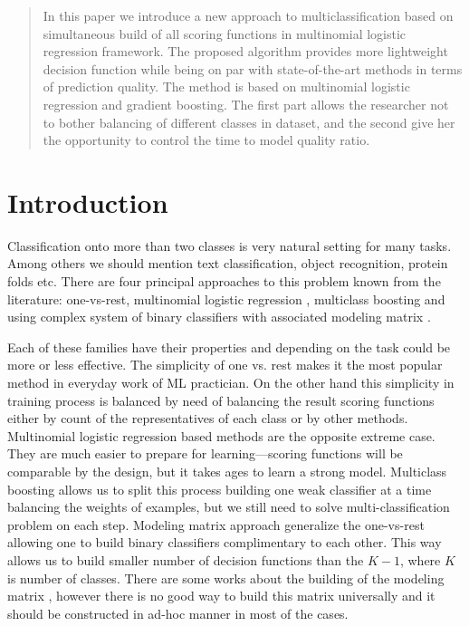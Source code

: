\documentclass{article}
\begin{document}
\begin{abstract} 
In this paper we introduce a new approach to multiclassification based on simultaneous build of all scoring functions in multinomial logistic regression framework. The proposed algorithm provides more lightweight decision function while being on par with state-of-the-art methods in terms of prediction quality. The method is based on multinomial logistic regression and gradient boosting. The first part allows the researcher not to bother balancing of different classes in dataset, and the second give her the opportunity to control the time to model quality ratio.
\end{abstract} 

\section{Introduction}
\label{introduction}
Classification onto more than two classes is very natural setting for many tasks. Among others we should mention text classification, object recognition, protein folds etc. There are four principal approaches to this problem known from the literature: one-vs-rest, multinomial logistic regression \cite{GLM}, multiclass boosting \cite{journals/jmlr/MukherjeeS13} and using complex system of binary classifiers with associated modeling matrix \cite{Allwein00reducingmulticlass}.

Each of these families have their properties and depending on the task could be more or less effective. The simplicity of one vs. rest makes it the most popular method in everyday work of ML practician. On the other hand this simplicity in training process is balanced by need of balancing the result scoring functions either by count of the representatives of each class or by other methods. Multinomial logistic regression based methods are the opposite extreme case. They are much easier to prepare for learning---scoring functions will be comparable by the design, but it takes ages to learn a strong model. Multiclass boosting allows us to split this process building one weak classifier at a time balancing the weights of examples, but we still need to solve multi-classification problem on each step. Modeling matrix approach generalize the one-vs-rest allowing one to build binary classifiers complimentary to each other. This way allows us to build smaller number of decision functions than the $K-1$, where $K$ is number of classes. There are some works about the building of the modeling matrix \cite{Zhao_sparseoutput, modelmatrix2}, however there is no good way to build this matrix universally and it should be constructed in ad-hoc manner in most of the cases.
\end{document}
